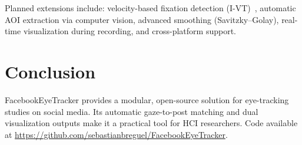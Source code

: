 \documentclass[11pt,a4paper]{article}
\begin{document}
Planned extensions include: velocity-based fixation detection
(I-VT)~\citep{salvucci2000identifying}, automatic AOI extraction via
computer vision, advanced smoothing (Savitzky--Golay), real-time
visualization during recording, and cross-platform support.

\section{Conclusion}
\label{sec:conclusion}

FacebookEyeTracker provides a modular, open-source solution for
eye-tracking studies on social media. Its automatic gaze-to-post matching
and dual visualization outputs make it a practical tool for HCI
researchers. Code available at
\url{https://github.com/sebastianbreguel/FacebookEyeTracker}.



\end{document}
